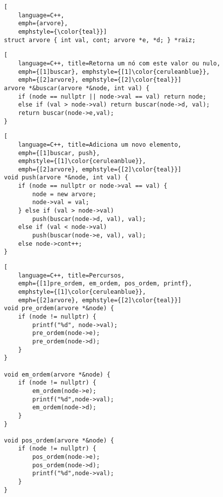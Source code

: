 \begin{lstlisting}[
    language=C++,
    emph={arvore}, 
    emphstyle={\color{teal}}]
struct arvore { int val, cont; arvore *e, *d; } *raiz;
\end{lstlisting} 

\begin{lstlisting}[
    language=C++, title=Retorna um nó com este valor ou nulo,
    emph={[1]buscar}, emphstyle={[1]\color{ceruleanblue}},
    emph={[2]arvore}, emphstyle={[2]\color{teal}}]
arvore *&buscar(arvore *&node, int val) {
    if (node == nullptr || node->val == val) return node;
    else if (val > node->val) return buscar(node->d, val);
    return buscar(node->e,val);
}
\end{lstlisting} 
\newpage

\begin{lstlisting}[
    language=C++, title=Adiciona um novo elemento,
    emph={[1]buscar, push},
    emphstyle={[1]\color{ceruleanblue}},
    emph={[2]arvore}, emphstyle={[2]\color{teal}}]
void push(arvore *&node, int val) {
    if (node == nullptr or node->val == val) {
        node = new arvore;
        node->val = val;
    } else if (val > node->val) 
    	push(buscar(node->d, val), val);
    else if (val < node->val) 
    	push(buscar(node->e, val), val);   
    else node->cont++;
}
\end{lstlisting}

\begin{lstlisting}[
    language=C++, title=Percursos,
    emph={[1]pre_ordem, em_ordem, pos_ordem, printf},
    emphstyle={[1]\color{ceruleanblue}},
    emph={[2]arvore}, emphstyle={[2]\color{teal}}]
void pre_ordem(arvore *&node) {
    if (node != nullptr) {
        printf("%d", node->val);
        pre_ordem(node->e); 
        pre_ordem(node->d);  
    }
}

void em_ordem(arvore *&node) {
    if (node != nullptr) {
        em_ordem(node->e);
        printf("%d",node->val);
        em_ordem(node->d);  
    }
}

void pos_ordem(arvore *&node) {
    if (node != nullptr) {
        pos_ordem(node->e);
        pos_ordem(node->d);
        printf("%d",node->val);    
    } 
}
\end{lstlisting}